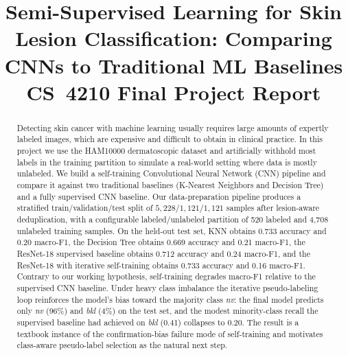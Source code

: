 \documentclass[conference]{IEEEtran}
\begin{document}
\title{Semi-Supervised Learning for Skin Lesion Classification:
Comparing CNNs to Traditional ML Baselines\\
\large CS~4210 Final Project Report}

\author{
}

\maketitle

\begin{abstract}
Detecting skin cancer with machine learning usually requires large
amounts of expertly labeled images, which are expensive and difficult
to obtain in clinical practice. In this project we use the HAM10000
dermatoscopic dataset and artificially withhold most labels in the
training partition to simulate a real-world setting where data is
mostly unlabeled. We build a self-training Convolutional Neural
Network (CNN) pipeline and compare it against two traditional
baselines (K-Nearest Neighbors and Decision Tree) and a fully
supervised CNN baseline. Our data-preparation pipeline produces a
stratified train/validation/test split of $5{,}228 / 1{,}121 / 1{,}121$
samples after lesion-aware deduplication, with a configurable
labeled/unlabeled partition of 520 labeled and 4{,}708 unlabeled
training samples. On the held-out test set, KNN obtains 0.733
accuracy and 0.20 macro-F1, the Decision Tree obtains 0.669 accuracy
and 0.21 macro-F1, the ResNet-18 supervised baseline obtains 0.712
accuracy and 0.24 macro-F1, and the ResNet-18 with iterative
self-training obtains 0.733 accuracy and 0.16 macro-F1. Contrary to
our working hypothesis, self-training degrades macro-F1 relative to
the supervised CNN baseline. Under heavy class imbalance the
iterative pseudo-labeling loop reinforces the model's bias toward the
majority class \emph{nv}: the final model predicts only \emph{nv}
(96\%) and \emph{bkl} (4\%) on the test set, and the modest
minority-class recall the supervised baseline had achieved on
\emph{bkl} (0.41) collapses to 0.20. The result is a textbook instance
of the confirmation-bias failure mode of self-training and motivates
class-aware pseudo-label selection as the natural next step.
\end{abstract}
\end{document}
